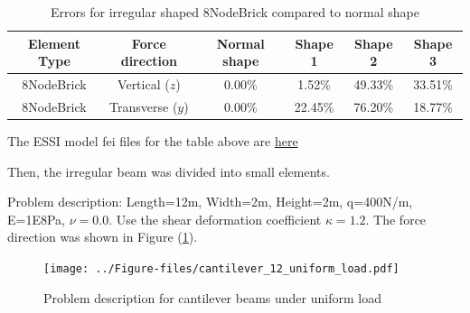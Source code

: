 \documentclass[fleqn,11pt]{article}
\begin{document}
\begin{table}[H]
  \centering
  \caption{Errors for irregular shaped 8NodeBrick compared to normal shape}
  \label{talbe Errors for irregular shaped 8NodeBrick compared to normal shape}
  \begin{tabular}{|c|c|c|c|c|c|}
    \hline 
    Element Type   & Force direction & Normal shape & Shape 1 & Shape 2 & Shape 3  \\ \hline 
    8NodeBrick     & Vertical ($z$)     & 0.00\% & 1.52\%  & 49.33\% & 33.51\%       \\ \hline
    8NodeBrick     & Transverse ($y$)   & 0.00\% & 22.45\% & 76.20\% & 18.77\%       \\ \hline
  \end{tabular}
\end{table}

The ESSI model fei files for the table above are \href{https://github.com/yuan-energy/ESSI_Verification/blob/master/8NodeBrick/cantilever_irregular_element/cantilever_irregular_element.tar.gz?raw=true}{here}




\newpage
Then, the irregular beam was divided into small elements. 


Problem description: Length=12m, Width=2m, Height=2m, q=400N/m, E=1E8Pa, $\nu=0.0$. Use the shear deformation coefficient $\kappa=1.2$. The force direction was shown in Figure (\ref{fig Problem description for cantilever beams under uniform pressure}). 

\begin{figure}[H]
  \centering
  \texttt{[image: ../Figure-files/cantilever\_12\_uniform\_load.pdf]}
  \caption{Problem description for cantilever beams under uniform load  }
  \label{fig Problem description for cantilever beams under uniform pressure}
\end{figure}
\end{document}
